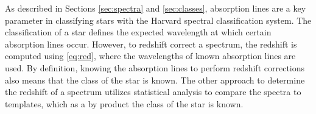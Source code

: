 \documentclass[conference]{IEEEtran}
\begin{document}
        \begin{table}
        
        \centering
        \caption{Example of the feature matrix that has redshifted data}
        \label{tab:example}
        \end{table}
        
	As described in Sections \ref{sec:spectra} and \ref{sec:classes}, absorption lines are a key parameter in classifying stars with the Harvard spectral classification system. The classification of a star defines the expected wavelength at which certain absorption lines occur. However, to redshift correct a spectrum, the redshift is computed using \eqref{eq:red}, where the wavelengths of known absorption lines are used.  By definition, knowing the absorption lines to perform redshift corrections also means that the class of the star is known. The other approach to determine the redshift of a spectrum utilizes statistical analysis to compare the spectra to templates, which as a by product the class of the star is known. 
\end{document}
